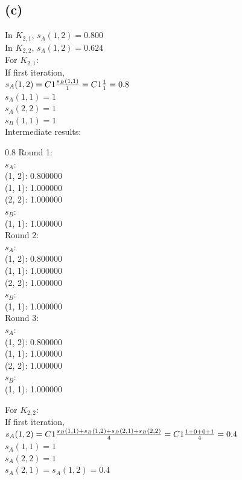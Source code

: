 \documentclass{article}
\newenvironment{myenv}[1]
  {\begin{spacing}{#1}}
  {\end{spacing}}
\begin{document}
\subsection{(c)}
In $K_{2,1}$, $s_A(1, 2) = 0.800$ \\
In $K_{2,2}$, $s_A(1, 2) = 0.624$ \\

For $K_{2,1}$: \\

If first iteration, \\
$s_A(1, 2) =  \\ C1\frac{s_B(1, 1)}{1} =\\ C1\frac{1}{1} = 0.8$ \\
$s_A(1, 1) =  1$ \\
$s_A(2, 2) =  1$ \\
$s_B(1, 1) =  1$ \\


Intermediate results: \\

\begin{myenv}{0.8}
Round 1:\\ 
$s_A$:\\
(1, 2): 0.800000 \\
(1, 1): 1.000000 \\
(2, 2): 1.000000 \\
$s_B$:\\
(1, 1): 1.000000 \\
Round 2:\\ 
$s_A$:\\
(1, 2): 0.800000 \\
(1, 1): 1.000000 \\
(2, 2): 1.000000 \\
$s_B$:\\
(1, 1): 1.000000 \\
Round 3:\\ 
$s_A$:\\
(1, 2): 0.800000 \\
(1, 1): 1.000000 \\
(2, 2): 1.000000 \\
$s_B$:\\
(1, 1): 1.000000 \\
\end{myenv}

For $K_{2,2}$: \\

If first iteration, \\
$s_A(1, 2) =  \\ C1\frac{s_B(1, 1) + s_B(1, 2) + s_B(2, 1) + s_B(2, 2)}{4} =\\ C1\frac{1 + 0 + 0 + 1}{4} = 0.4$ \\
$s_A(1, 1) =  1$ \\
$s_A(2, 2) =  1$ \\
$s_A(2, 1) =  s_A(1, 2) = 0.4$ \\
\end{document}

